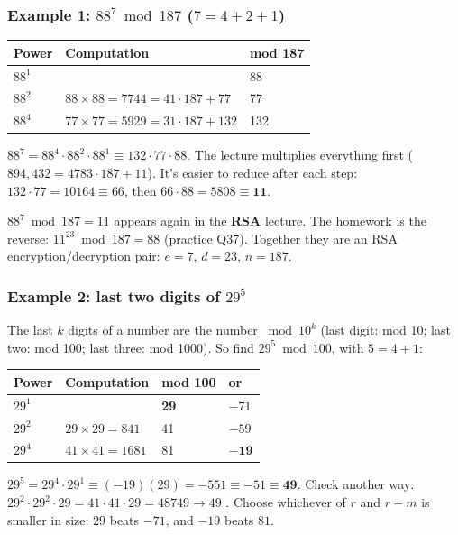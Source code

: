 \subsubsection*{Example 1: $88^7 \bmod 187$ \quad ($7 = 4 + 2 + 1$)}
\begin{center}\small
\begin{tabular}{@{}lll@{}}
\toprule
Power & Computation & mod 187\\
\midrule
$88^1$ & & 88\\
$88^2$ & $88 \times 88 = 7744 = 41\cdot187 + 77$ & 77\\
$88^4$ & $77 \times 77 = 5929 = 31\cdot187 + 132$ & 132\\
\bottomrule
\end{tabular}
\end{center}
$88^7 = 88^4 \cdot 88^2 \cdot 88^1 \equiv 132 \cdot 77 \cdot 88$. The lecture multiplies everything first ($894{,}432 = 4783\cdot187 + 11$). It's easier to reduce after each step:
$132 \cdot 77 = 10164 \equiv 66$, then $66 \cdot 88 = 5808 \equiv \mathbf{11}$.
\begin{keybox}[title=Bookmark this (the lecturer's advice)]
$88^7 \bmod 187 = 11$ appears again in the \textbf{RSA} lecture. The homework is the reverse: $11^{23} \bmod 187 = 88$ (practice Q37). Together they are an RSA encryption/decryption pair: $e = 7$, $d = 23$, $n = 187$.
\end{keybox}

\subsubsection*{Example 2: last two digits of $29^5$}
The last $k$ digits of a number are the number $\bmod 10^k$ (last digit: mod 10; last two: mod 100; last three: mod 1000). So find $29^5 \bmod 100$, with $5 = 4 + 1$:
\begin{center}\small
\begin{tabular}{@{}llll@{}}
\toprule
Power & Computation & mod 100 & or\\
\midrule
$29^1$ & & \textbf{29} & $-71$\\
$29^2$ & $29 \times 29 = 841$ & 41 & $-59$\\
$29^4$ & $41 \times 41 = 1681$ & 81 & $\mathbf{-19}$\\
\bottomrule
\end{tabular}
\end{center}
$29^5 = 29^4 \cdot 29^1 \equiv (-19)(29) = -551 \equiv -51 \equiv \mathbf{49}$. Check another way: $29^2 \cdot 29^2 \cdot 29 = 41 \cdot 41 \cdot 29 = 48749 \to 49$ \checkmark.
Choose whichever of $r$ and $r - m$ is smaller in size: $29$ beats $-71$, and $-19$ beats $81$.

